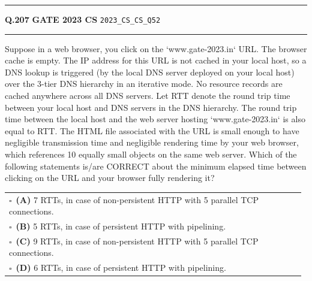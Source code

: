 \documentclass[a4paper,10pt]{article}
\begin{document}
\vspace{6pt}\hrule height 0.35pt\vspace{6pt}
\noindent
\begin{tcolorbox}[
    blanker,
    sidebyside,
    sidebyside align=top,
    lefthand width=0.55\textwidth,
    top=4pt, bottom=4pt, left=0pt, right=0pt,
    middle=16pt,
    underlay={
        \draw[dashed, black!80, line width=0.8pt, dash pattern=on 4pt off 3pt]
            ([xshift=0.55\textwidth+8pt]frame.north west) --
            ([xshift=0.55\textwidth+8pt]frame.south west);
    }
]
\textbf{Q.207}  \hfill {\footnotesize\textbf{GATE 2023 CS} \quad \tiny\texttt{2023\_CS\_CS\_Q52}}
\vspace{2pt}\hrule height 0.3pt\vspace{4pt}

Suppose in a web browser, you click on the `www.gate-2023.in` URL. The browser cache is empty. The IP address for this URL is not cached in your local host, so a DNS lookup is triggered (by the local DNS server deployed on your local host) over the 3-tier DNS hierarchy in an iterative mode. No resource records are cached anywhere across all DNS servers.
Let RTT denote the round trip time between your local host and DNS servers in the DNS hierarchy. The round trip time between the local host and the web server hosting `www.gate-2023.in` is also equal to RTT. The HTML file associated with the URL is small enough to have negligible transmission time and negligible rendering time by your web browser, which references 10 equally small objects on the same web server.
Which of the following statements is/are CORRECT about the minimum elapsed time between clicking on the URL and your browser fully rendering it?

\par\vspace{6pt}\noindent
\begin{tabular}{@{}p{0.98\linewidth}@{}}
$\square$\ \textbf{(A)} 7 RTTs, in case of non-persistent HTTP with 5 parallel TCP connections. \\
\addlinespace[3pt]
$\square$\ \textbf{(B)} 5 RTTs, in case of persistent HTTP with pipelining. \\
\addlinespace[3pt]
$\square$\ \textbf{(C)} 9 RTTs, in case of non-persistent HTTP with 5 parallel TCP connections. \\
\addlinespace[3pt]
$\square$\ \textbf{(D)} 6 RTTs, in case of persistent HTTP with pipelining.
\end{tabular}


\end{tcolorbox}
\end{document}
